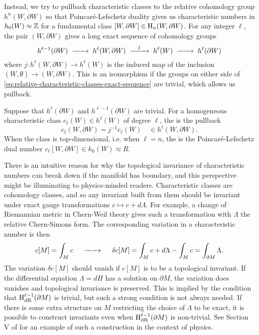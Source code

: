 Instead, we try to pullback characteristic classes to the relative cohomology group $h^n(W,\partial W)$ so that Poincar\'e-Lefschetz duality gives us characteristic numbers in $h_0(W)\approx \mathbb{Z}$ for a fundamental class $[W,\partial W]\in \operatorname{H}_n(W,\partial W)$.
For any integer $\ell$, the pair $(W, \partial W)$ gives a long exact sequence of cohomology groups
\begin{equation}\label{eq:relative-characteristic-classes-exact-sequence}
	h^{\ell-1}(\partial W) \lkxto h^{\ell}(W, \partial W) \lkxto[j] h^{\ell}(W) \lkxto h^{\ell}(\partial W)
\end{equation}
where $j : h^{\ell}(W, \partial W) \to h^{\ell}(W)$ is the induced map of the inclusion $(W,\emptyset) \to (W, \partial W)$. This is an isomorphism if the groups on either side of \cref{eq:relative-characteristic-classes-exact-sequence} are trivial, which allows us pullback.

\begin{definition}\label{defn:relative-characteristic_form}
	Suppose that $h^{\ell}(\partial W)$ and $h^{\ell-1}(\partial W)$ are trivial. For a homogeneous characteristic class $c_\ell(W) \in h^{\ell}(W)$ of degree $\ell$, the  is the pullback
	\[
		c_\ell(W, \partial W) = j^{-1} c_\ell(W) \quad\in h^{\ell}(W, \partial W).
	\]
	When the class is top-dimensional, i.e. when $\ell=n$, the  is the Poincar\'e-Lefschetz dual number $c_\ell[W,\partial W] \in h_0(W)\approx R$.
\end{definition}

\begin{remark*}
	There is an intuitive reason for why the topological invariance of characteristic numbers can break down if the manifold has boundary, and this perspective might be illuminating to physics-minded readers. Characteristic classes are cohomology classes, and so any invariant built from them should be invariant under exact gauge transformations $c\mapsto c+d\Lambda$. For example, a change of Riemannian metric in Chern-Weil theory gives such a transformation with $\Lambda$ the relative Chern-Simons form. The corresponding variation in a characteristic number is then
	\[
		c[M] = \int_M c \quad\lkxto\quad \delta c[M] = \int_M c+d\Lambda-\int_M c = \int_{\partial M} \Lambda.
	\]
	The variation $\delta c[M]$ should vanish if $c[M]$ is to be a topological invariant. If the differential equation $\Lambda=dH$ has a solution on $\partial M$, the variation does vanishes and topological invariance is preserved. This is implied by the condition that $\operatorname{H}_{\mathrm{dR}}^{\ell-1}(\partial M)$ is trivial, but such a strong condition is not always needed. If there is some extra structure on $M$ restricting the choice of $\Lambda$ to be exact, it is possible to construct invariants even when $\operatorname{H}_{\mathrm{dR}}^{\ell-1}(\partial M)$ is non-trivial. See Section V of \cite{witten1985anomalies} for an example of such a construction in the context of physics.
\end{remark*}

